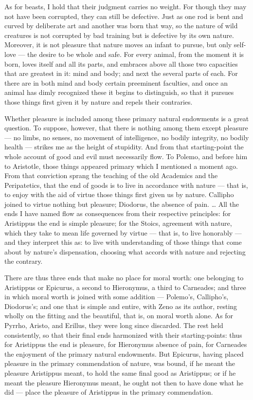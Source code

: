  As for beasts, I hold that their judgment carries no weight. For though they may not have been corrupted, they can still be defective. Just as one rod is bent and curved by deliberate art and another was born that way, so the nature of wild creatures is not corrupted by bad training but is defective by its own nature. Moreover, it is not pleasure that nature moves an infant to pursue, but only self-love — the desire to be whole and safe. For every animal, from the moment it is born, loves itself and all its parts, and embraces above all those two capacities that are greatest in it: mind and body; and next the several parts of each. For there are in both mind and body certain preeminent faculties, and once an animal has dimly recognized these it begins to distinguish, so that it pursues those things first given it by nature and repels their contraries.

 Whether pleasure is included among these primary natural endowments is a great question. To suppose, however, that there is nothing among them except pleasure — no limbs, no senses, no movement of intelligence, no bodily integrity, no bodily health — strikes me as the height of stupidity. And from that starting-point the whole account of good and evil must necessarily flow. To Polemo, and before him to Aristotle, those things appeared primary which I mentioned a moment ago. From that conviction sprang the teaching of the old Academics and the Peripatetics, that the end of goods is to live in accordance with nature — that is, to enjoy with the aid of virtue those things first given us by nature. Callipho joined to virtue nothing but pleasure; Diodorus, the absence of pain. … All the ends I have named flow as consequences from their respective principles: for Aristippus the end is simple pleasure; for the Stoics, agreement with nature, which they take to mean life governed by virtue — that is, to live honorably — and they interpret this as: to live with understanding of those things that come about by nature's dispensation, choosing what accords with nature and rejecting the contrary.

 There are thus three ends that make no place for moral worth: one belonging to Aristippus or Epicurus, a second to Hieronymus, a third to Carneades; and three in which moral worth is joined with some addition — Polemo's, Callipho's, Diodorus's; and one that is simple and entire, with Zeno as its author, resting wholly on the fitting and the beautiful, that is, on moral worth alone. As for Pyrrho, Aristo, and Erillus, they were long since discarded. The rest held consistently, so that their final ends harmonized with their starting-points: thus for Aristippus the end is pleasure, for Hieronymus absence of pain, for Carneades the enjoyment of the primary natural endowments. But Epicurus, having placed pleasure in the primary commendation of nature, was bound, if he meant the pleasure Aristippus meant, to hold the same final good as Aristippus; or if he meant the pleasure Hieronymus meant, he ought not then to have done what he did — place the pleasure of Aristippus in the primary commendation.

